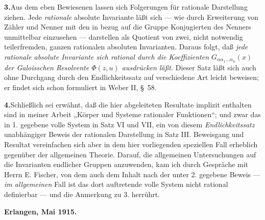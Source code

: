 \noindent\textbf{3.}\enspace Aus dem eben Bewiesenen lassen sich Folgerungen für rationale Darstellung ziehen. Jede \emph{rationale} absolute Invariante läßt sich --- wie durch Erweiterung von Zähler und Nenner mit den in bezug auf die Gruppe Konjugierten des Nenners unmittelbar einzusehen --- darstellen als Quotient von zwei, nicht notwendig teilerfremden, ganzen rationalen absoluten Invarianten. Daraus folgt, daß \emph{jede rationale absolute Invariante sich rational durch die Koeffizienten $G_{\alpha\alpha_1\ldots\alpha_n}(x)$ der Galoisschen Resolvente $\Phi(z,u)$ ausdrücken läßt.} Dieser Satz läßt sich auch ohne Durchgang durch den Endlichkeitssatz auf verschiedene Art leicht beweisen; er findet sich schon formuliert in Weber II, \S\ 58.

\newpage
\noindent\textbf{4.}\enspace Schließlich sei erwähnt, daß die hier abgeleiteten Resultate implizit enthalten sind in meiner Arbeit „Körper und Systeme rationaler Funktionen“; und zwar das in 1. gegebene volle System in Satz VI und VII, ein von diesem \emph{Endlichkeitssatz} unabhängiger Beweis der rationalen Darstellung in Satz III. Beweisgang und Resultat vereinfachen sich aber in dem hier vorliegenden speziellen Fall erheblich gegenüber der allgemeinen Theorie. Darauf, die allgemeinen Untersuchungen auf die Invarianten endlicher Gruppen anzuwenden, kam ich durch Gespräche mit Herrn E. Fischer, von dem auch dem Inhalt nach der unter 2. gegebene Beweis --- \emph{im allgemeinen} Fall ist das dort auftretende volle System nicht rational definierbar --- und die Anmerkung zu 3. herrührt.

\textbf{Erlangen, Mai 1915.}

\clearpage
